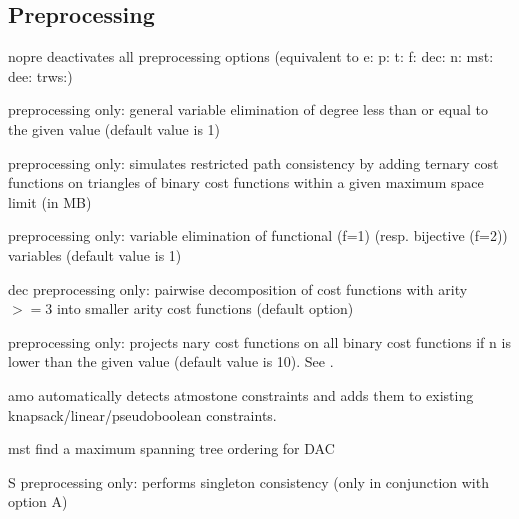 \documentclass[letterpaper,10pt,openany,oneside,english]{sphinxmanual}
\begin{document}
\subsection{Preprocessing}
\label{\detokenize{userdoc:preprocessing}}\begin{optionlist}{3cm}
\item [\sphinxhyphen{}nopre]  
\sphinxAtStartPar
deactivates all preprocessing options (equivalent to \sphinxhyphen{}e:
\sphinxhyphen{}p: \sphinxhyphen{}t: \sphinxhyphen{}f: \sphinxhyphen{}dec: \sphinxhyphen{}n: \sphinxhyphen{}mst: \sphinxhyphen{}dee: \sphinxhyphen{}trws:)
\end{optionlist}
\begin{description}
\sphinxAtStartPar
preprocessing only: general variable elimination
of degree less than or equal to the given value (default value is \sphinxhyphen{}1)

\sphinxAtStartPar
preprocessing only: simulates restricted path
consistency by adding ternary cost functions on triangles of binary
cost functions within a given maximum space limit (in MB)

\sphinxAtStartPar
preprocessing only: variable elimination of
functional (f=1) (resp. bijective (f=2)) variables (default value is 1)

\end{description}
\begin{optionlist}{3cm}
\item [\sphinxhyphen{}dec]  
\sphinxAtStartPar
preprocessing only: pairwise decomposition  of cost
functions with arity \(>=3\) into smaller arity cost functions
(default option)
\end{optionlist}
\begin{description}
\sphinxAtStartPar
preprocessing only: projects n\sphinxhyphen{}ary cost functions
on all binary cost functions if n is lower than the given value
(default value is 10). See .

\end{description}
\begin{optionlist}{3cm}
\item [\sphinxhyphen{}amo]  
\sphinxAtStartPar
automatically detects at\sphinxhyphen{}most\sphinxhyphen{}one constraints and adds them to existing
knapsack/linear/pseudo\sphinxhyphen{}boolean constraints.
\item [\sphinxhyphen{}mst]  
\sphinxAtStartPar
find a maximum spanning tree ordering for DAC
\item [\sphinxhyphen{}S]  
\sphinxAtStartPar
preprocessing only: performs singleton consistency (only in
conjunction with option \sphinxhyphen{}A)
\end{optionlist}
\end{document}
